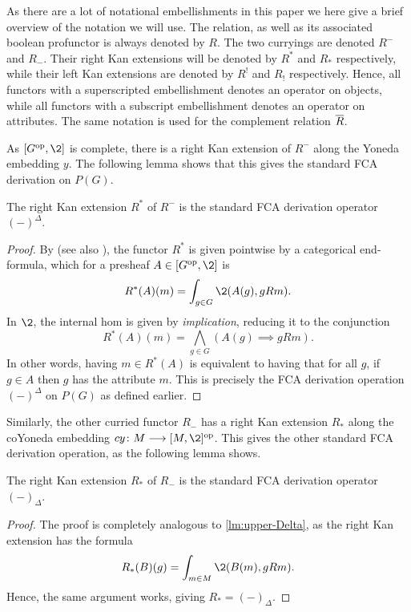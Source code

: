 \begin{remark}
    As there are a lot of notational embellishments in this paper we here give a brief overview of the notation we will use. The relation, as well as its associated boolean profunctor is always denoted by $R$. The two curryings are denoted $R^-$ and $R_-$. Their right Kan extensions will be denoted by $R^*$ and $R_*$ respectively, while their left Kan extensions are denoted by $R^!$ and $R_!$ respectively. Hence, all functors with a superscripted embellishment denotes an operator on objects, while all functors with a subscript embellishment denotes an operator on attributes. The same notation is used for the complement relation $\overline{R}$. 
\end{remark}

As $[G\op, \2]$ is complete, there is a right Kan extension of $R^-$ along the Yoneda embedding $y$. The following lemma shows that this gives the standard FCA derivation on $P(G)$. 

\begin{lemma}
    \label{lm:upper-Delta}
    The right Kan extension $R^*$ of $R^-$ is the standard FCA derivation operator $(-)^\Delta$. 
\end{lemma}
\begin{proof}
    By \cite[Section X.4]{maclane_1998} (see also \cite[Section 4]{kelly_1982}), the functor $R^*$ is given pointwise by a categorical end-formula, which for a presheaf $A\in [G\op, \2]$ is
    \[R^*(A)(m) = \int_{g\in G} \2(A(g), gRm).\]
    In $\2$, the internal hom is given by \emph{implication}, reducing it to the conjunction 
    \[R^*(A)(m) = \bigwedge_{g\in G}(A(g) \implies gRm).\]
    In other words, having $m\in R^*(A)$ is equivalent to having that for all $g$, if $g\in A$ then $g$ has the attribute $m$. This is precisely the FCA derivation operation $(-)^\Delta$ on $P(G)$ as defined earlier. 
\end{proof}

Similarly, the other curried functor $R_{-}$ has a right Kan extension $R_*$ along the coYoneda embedding $cy\: M\to [M,\2]\op$. This gives the other standard FCA derivation operation, as the following lemma shows.  

\begin{lemma}
    \label{lm:lower-Delta}
    The right Kan extension $R_*$ of $R_-$ is the standard FCA derivation operator $(-)_\Delta$. 
\end{lemma}
\begin{proof}
    The proof is completely analogous to \cref{lm:upper-Delta}, as the right Kan extension has the formula
    \[R_*(B)(g)=\int_{m\in M}\2(B(m), gRm).\]
    Hence, the same argument works, giving $R_* = (-)_\Delta$.
\end{proof}

